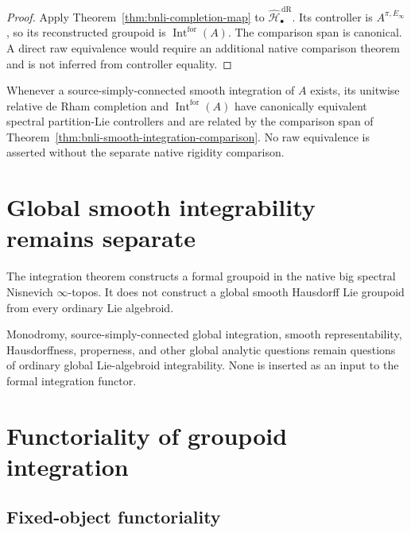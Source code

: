 \begin{proof}
Apply Theorem~\ref{thm:bnli-completion-map} to
\(\widehat{\mathcal H}^{\,\mathrm{dR}}_\bullet\).  Its controller is
\(A^{\pi,E_\infty}\), so its reconstructed groupoid is
\(\operatorname{Int}^{\mathrm{for}}(A)\).  The comparison span is canonical.  A direct raw equivalence would require an additional native comparison theorem and is not inferred from controller equality.
\end{proof}

\begin{corollary}
\label{cor:bnli-ssc-formal-germ}
Whenever a source-simply-connected smooth integration of $A$ exists, its
unitwise relative de Rham completion and
$\operatorname{Int}^{\mathrm{for}}(A)$ have canonically equivalent spectral
partition-Lie controllers and are related by the comparison span of
Theorem~\ref{thm:bnli-smooth-integration-comparison}.  No raw equivalence is
asserted without the separate native rigidity comparison.
\end{corollary}

\section{Global smooth integrability remains separate}
\label{sec:bnli-global-integrability}

\begin{remark}
The integration theorem constructs a formal groupoid in the native big
spectral Nisnevich \(\infty\)-topos.  It does not construct a global smooth
Hausdorff Lie groupoid from every ordinary Lie algebroid.

Monodromy, source-simply-connected global integration, smooth
representability, Hausdorffness, properness, and other global analytic
questions remain questions of ordinary global Lie-algebroid integrability.
None is inserted as an input to the formal integration functor.
\end{remark}

\section{Functoriality of groupoid integration}
\label{sec:bnli-functoriality}

\subsection{Fixed-object functoriality}

